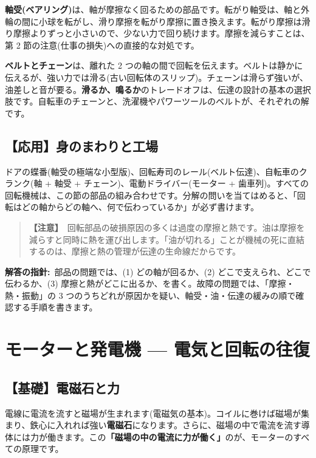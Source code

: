 \documentclass{article}
\begin{document}
\textbf{軸受(ベアリング)}は、軸が摩擦なく回るための部品です。転がり軸受は、軸と外輪の間に小球を転がし、滑り摩擦を転がり摩擦に置き換えます。転がり摩擦は滑り摩擦よりずっと小さいので、少ない力で回り続けます。摩擦を減らすことは、第 2 節の注意(仕事の損失)への直接的な対処です。

\textbf{ベルトとチェーン}は、離れた 2 つの軸の間で回転を伝えます。ベルトは静かに伝えるが、強い力では滑る(古い回転体のスリップ)。チェーンは滑らず強いが、油差しと音が要る。\textbf{滑るか、鳴るか}のトレードオフは、伝達の設計の基本の選択肢です。自転車のチェーンと、洗濯機やパワーツールのベルトが、それぞれの解です。

\subsection{【応用】身のまわりと工場}

ドアの蝶番(軸受の極端な小型版)、回転寿司のレール(ベルト伝達)、自転車のクランク(軸 + 軸受 + チェーン)、電動ドライバー(モーター + 歯車列)。すべての回転機械は、この節の部品の組み合わせです。分解の問いを当てはめると、「回転はどの軸からどの軸へ、何で伝わっているか」が必ず書けます。

\begin{quote}
\textbf{【注意】}\ 回転部品の破損原因の多くは過度の摩擦と熱です。油は摩擦を減らすと同時に熱を運び出します。「油が切れる」ことが機械の死に直結するのは、摩擦と熱の管理が伝達の生命線だからです。
\end{quote}

\textbf{解答の指針:}\ 部品の問題では、(1) どの軸が回るか、(2) どこで支えられ、どこで伝わるか、(3) 摩擦と熱がどこに出るか、を書く。故障の問題では、「摩擦・熱・振動」の 3 つのうちどれが原因かを疑い、軸受・油・伝達の緩みの順で確認する手順を書きます。

\section{モーターと発電機 — 電気と回転の往復}

\subsection{【基礎】電磁石と力}

電線に電流を流すと磁場が生まれます(電磁気の基本)。コイルに巻けば磁場が集まり、鉄心に入れれば強い\textbf{電磁石}になります。さらに、磁場の中で電流を流す導体には力が働きます。この\textbf{「磁場の中の電流に力が働く」}のが、モーターのすべての原理です。
\end{document}
